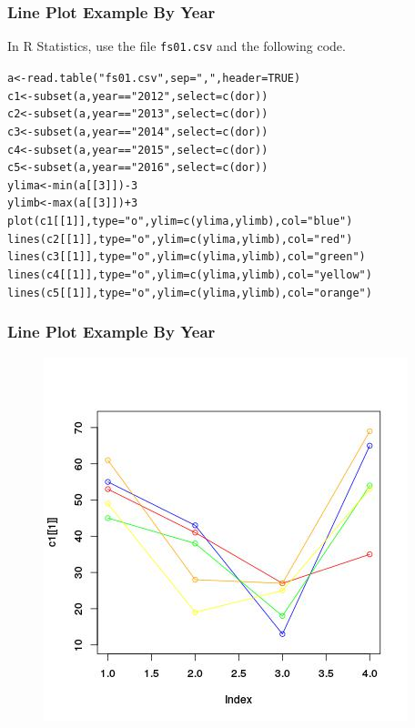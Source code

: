 \documentclass[xcolor=dvipsnames]{beamer}
\begin{document}

\begin{frame}
  \frametitle{Line Plot Example By Year}
In R Statistics, use the file \texttt{fs01.csv} and the following
code.
\begin{alltt}
\small
a<-read.table("fs01.csv",sep=",",header=TRUE)\newline
c1<-subset(a,year=="2012",select=c(dor))\newline
c2<-subset(a,year=="2013",select=c(dor))\newline
c3<-subset(a,year=="2014",select=c(dor))\newline
c4<-subset(a,year=="2015",select=c(dor))\newline
c5<-subset(a,year=="2016",select=c(dor))\newline
ylima<-min(a[[3]])-3\newline
ylimb<-max(a[[3]])+3\newline
plot(c1[[1]],type="o",ylim=c(ylima,ylimb),col="blue")\newline
lines(c2[[1]],type="o",ylim=c(ylima,ylimb),col="red")\newline
lines(c3[[1]],type="o",ylim=c(ylima,ylimb),col="green")\newline
lines(c4[[1]],type="o",ylim=c(ylima,ylimb),col="yellow")\newline
lines(c5[[1]],type="o",ylim=c(ylima,ylimb),col="orange")
\end{alltt}
\end{frame}

\begin{frame}
  \frametitle{Line Plot Example By Year}
\begin{figure}[h]
\includegraphics[scale=.6]{./lineplot2.jpg}
\end{figure}
\end{frame}
\end{document}
